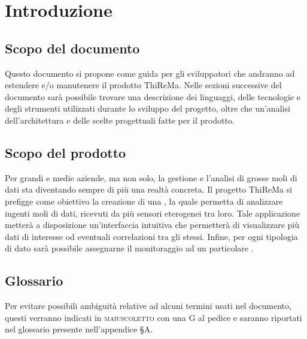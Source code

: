 \section{Introduzione}
	\subsection{Scopo del documento}
		Questo documento si propone come guida per gli sviluppatori che andranno ad estendere e/o manutenere il prodotto ThiReMa. 
		\newline
		Nelle sezioni successive del documento sarà possibile trovare una descrizione dei linguaggi, delle tecnologie e degli strumenti utilizzati durante lo sviluppo del progetto, oltre che un'analisi dell'architettura e delle scelte progettuali fatte per il prodotto.
	\subsection{Scopo del prodotto}
	 	Per grandi e medie aziende, ma non solo, la gestione e l'analisi di grosse moli di dati sta diventando sempre di più una realtà concreta.
	 	\newline
		Il progetto ThiReMa si prefigge come obiettivo la creazione di una , la quale permetta di analizzare ingenti moli di dati, ricevuti da più sensori eterogenei tra loro. Tale applicazione metterà a disposizione un'interfaccia intuitiva che permetterà di visualizzare più dati di interesse od eventuali correlazioni tra gli stessi. Infine, per ogni tipologia di dato sarà possibile assegnarne il monitoraggio ad un particolare .	
	\subsection{Glossario}
		Per evitare possibili ambiguità relative ad alcuni termini usati nel documento, questi verranno indicati in \textsc{maiuscoletto} con una G al pedice e saranno riportati nel glossario presente nell'appendice \S A.
